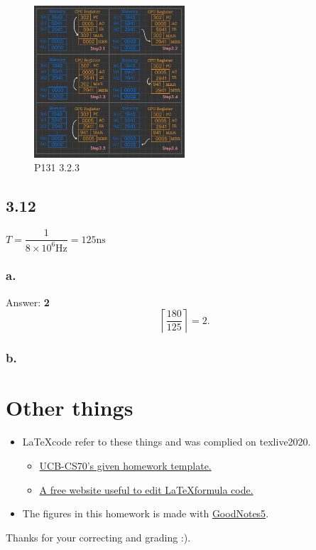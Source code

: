 \documentclass[11pt]{article}  %
\begin{document}
\begin{figure}[H]
    \centering
    \includegraphics[width=0.5\textwidth]{pic/p2/p2-3.pdf}
    \caption{P131 3.2.3}
\end{figure}

\subsection*{3.12}
    $ T = \dfrac{1}{8\times 10^6\text{Hz}} = 125 \text{ns}$

\subsubsection*{a.}

    Answer: \textbf{2}
    $$
    \left \lceil \frac{180}{125}  \right \rceil = 2.
    $$

\subsubsection*{b.}


\section*{Other things}

\begin{itemize}
    \item \LaTeX \space code refer to these things and was complied on texlive2020.
    \begin{itemize}
        \item  \href{https://www.eecs70.org/assets/misc/homework_template.tex}{UCB-CS70's given homework template.} 
        \item  \href{https://www.latexlive.com}{A free website useful to edit \LaTeX \space formula code.}
    \end{itemize}
    \item The figures in this homework is made with \href{https://apps.apple.com/us/app/goodnotes-5/id1444383602}{GoodNotes5}.
\end{itemize}

    Thanks for your correcting and grading :).
\end{document}

